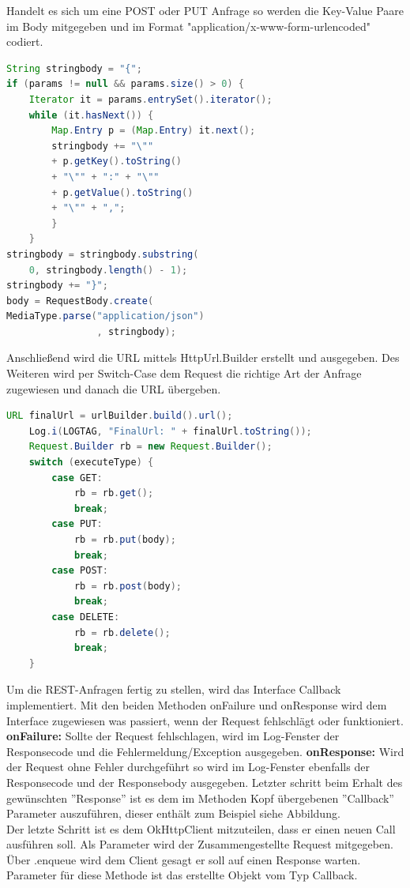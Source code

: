 Handelt es sich um eine POST oder PUT Anfrage so werden die Key-Value Paare im Body mitgegeben und im Format "application/x-www-form-urlencoded" codiert.
\begin{lstlisting}[language=Java,caption={POST oder PUT Request}]
String stringbody = "{";
if (params != null && params.size() > 0) {
  	Iterator it = params.entrySet().iterator();
    while (it.hasNext()) {
       	Map.Entry p = (Map.Entry) it.next();
        stringbody += "\"" 
        + p.getKey().toString() 
        + "\"" + ":" + "\"" 
        + p.getValue().toString() 
        + "\"" + ",";
        }
    }
stringbody = stringbody.substring(
  	0, stringbody.length() - 1);
stringbody += "}";
body = RequestBody.create(
MediaType.parse("application/json")
       			, stringbody);
\end{lstlisting}
Anschließend wird die URL mittels HttpUrl.Builder erstellt und ausgegeben. 
Des Weiteren wird per Switch-Case dem Request die richtige Art der Anfrage zugewiesen und danach die URL übergeben. 
\begin{lstlisting}[language=Java,caption={Zuweisung der Art der Anfrage}]
URL finalUrl = urlBuilder.build().url();
    Log.i(LOGTAG, "FinalUrl: " + finalUrl.toString());
    Request.Builder rb = new Request.Builder();
    switch (executeType) {
        case GET:
            rb = rb.get();
            break;
        case PUT:
            rb = rb.put(body);
            break;
        case POST:
            rb = rb.post(body);
            break;
        case DELETE:
            rb = rb.delete();
            break;
    }
\end{lstlisting}
Um die REST-Anfragen fertig zu stellen, wird das Interface Callback implementiert. Mit den beiden Methoden onFailure und onResponse wird dem Interface zugewiesen was passiert, wenn der Request fehlschlägt oder funktioniert. 
\\
\textbf{onFailure:}
Sollte der Request fehlschlagen, wird im Log-Fenster der Responsecode und die Fehlermeldung/Exception ausgegeben. 
\textbf{onResponse:}
Wird der Request ohne Fehler durchgeführt so wird im Log-Fenster ebenfalls der Responsecode und der Responsebody ausgegeben. Letzter schritt beim Erhalt des gewünschten ''Response'' ist es dem im Methoden Kopf übergebenen ''Callback'' Parameter auszuführen, dieser enthält zum Beispiel siehe Abbildung.
\\
Der letzte Schritt ist es dem OkHttpClient mitzuteilen, dass er einen neuen Call ausführen soll. Als Parameter wird der Zusammengestellte Request mitgegeben. Über .enqueue wird dem Client gesagt er soll auf einen Response warten. Parameter für diese Methode ist das erstellte Objekt vom Typ Callback.
